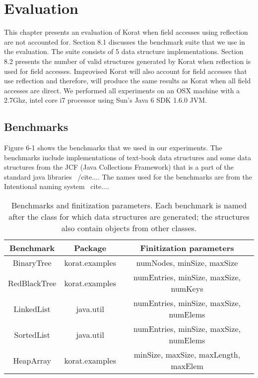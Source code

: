 \chapter{Evaluation}
This chapter presents an evaluation of Korat when field accesses using reflection are not accounted for. Section 8.1 discusses the benchmark suite that we use in the evaluation. The suite consists of 5 data structure implementations. Section 8.2 presents the number of valid structures generated by Korat when reflection is used for field accesses. Improvised Korat will also account for field accesses that use reflection and therefore, will produce the same results as Korat when all field accesses are direct. We performed all experiments on an OSX machine with a  2.7Ghz, intel core i7 processor using Sun’s Java 6 SDK 1.6.0 JVM.

\section{Benchmarks}
Figure 6-1 shows the benchmarks that we used in our experiments. The benchmarks include implementations of text-book data structures and some data structures from the JCF (Java Collections Framework) that is a part of the standard java libraries ~/cite{...}. The names used for the benchmarks are from the Intentional naming system ~cite{...}.

\begin{table}[h]
\begin{tabular}{|c|c|c|}
\hline
Benchmark    & Package        & Finitization parameters                \\ \hline
BinaryTree   & korat.examples & numNodes, minSize, maxSize             \\ \hline
RedBlackTree & korat.examples & numEntries, minSize, maxSize, numKeys  \\ \hline
LinkedList   & java.util      & numEntries, minSize, maxSize, numElems \\ \hline
SortedList   & java.util      & numEntries, minSize, maxSize, numElems \\ \hline
HeapArray    & korat.examples & minSize, maxSize, maxLength, maxElem   \\ \hline
\end{tabular}
\label{fig:benchmarksAndFinitizationParams}
\caption{Benchmarks and finitization parameters. Each benchmark is named after the class for which data structures are generated; the structures also contain objects from other classes.}
\end{table}

